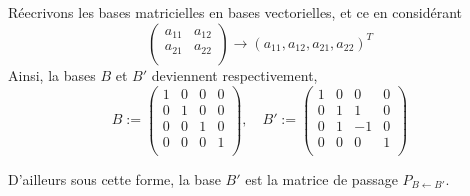 \subsection{}
Réecrivons les bases matricielles en bases vectorielles, et ce en considérant 
\[
\begin{pmatrix}
a_{11} & a_{12} \\
a_{21} & a_{22} \\
\end{pmatrix}
\longrightarrow (a_{11},a_{12},a_{21},a_{22})^T\]
Ainsi, la bases $B$ et $B'$ deviennent respectivement,
\[B:=
\begin{pmatrix}
1 & 0 & 0 & 0 \\
0 & 1 & 0 & 0 \\
0 & 0 & 1 & 0 \\
0 & 0 & 0 & 1 \\
\end{pmatrix},\quad B':=
\begin{pmatrix}
1 & 0 & 0 & 0 \\
0 & 1 & 1 & 0 \\
0 & 1 & -1 & 0 \\
0 & 0 & 0 & 1 \\
\end{pmatrix}
\]

D'ailleurs sous cette forme, la base $B'$ est la matrice de passage $P_{B\leftarrow B'}$.

